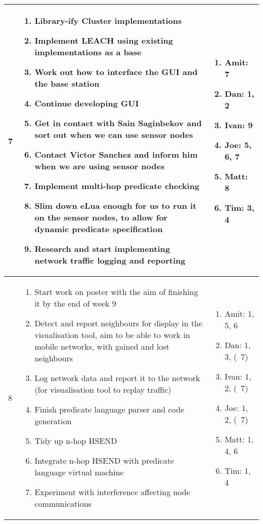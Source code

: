 \begin{center}
\begin{longtable}{| l | p{9cm} | p{3.5cm} |}
	7 & \begin{enumerate}
			\item Library-ify Cluster implementations
			\item Implement LEACH  using existing implementations as a base
			\item Work out how to interface the GUI and the base station
			\item Continue developing GUI
			\item Get in contact with Sain Saginbekov and sort out when we can use sensor nodes
			\item Contact Victor Sanchez and inform him when we are using sensor nodes
			\item Implement multi-hop predicate checking
			\item Slim down eLua enough for us to run it on the sensor nodes, to allow for dynamic predicate specification
			\item Research and start implementing network traffic logging and reporting
		\end{enumerate} &
	\begin{enumerate}
		\item[] Amit: 7
		\item[] Dan: 1, 2
		\item[] Ivan: 9
		\item[] Joe: 5, 6, 7
		\item[] Matt: 8
		\item[] Tim: 3, 4
	\end{enumerate}
	\\ \hline
	
	8 & \begin{enumerate}
			\item Start work on poster with the aim of finishing it by the end of week 9
			\item Detect and report neighbours for display in the visualisation tool, aim to be able to work in mobile networks, with gained and lost neighbours
			\item Log network data and report it to the network (for visualisation tool to replay traffic)
			\item Finish predicate language parser and code generation
			\item Tidy up n-hop HSEND
			\item Integrate n-hop HSEND with predicate language virtual machine
			\item Experiment with interference affecting node communications
		\end{enumerate} &
	\begin{enumerate}
		\item[] Amit: 1, 5, 6
		\item[] Dan: 1, 3, (~7)
		\item[] Ivan: 1, 2, (~7)
		\item[] Joe: 1, 2, (~7)
		\item[] Matt: 1, 4, 6
		\item[] Tim: 1, 4
	\end{enumerate}
	\\ \hline


\end{longtable}
\end{center}
